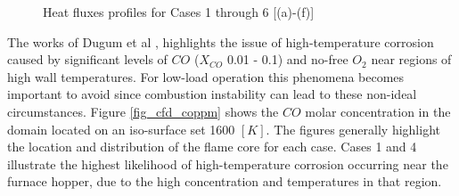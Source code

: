 \documentclass[review]{elsarticle}
\begin{document}
\begin{figure}[h!]
\hspace{5mm}
\caption{Heat fluxes profiles for Cases 1 through 6 [(a)-(f)]}
\label{fig_cfd_heat_flux}
\end{figure}

The works of Dugum et al \citep{Du2017}, highlights the issue of high-temperature corrosion caused by significant levels of $CO$ ($X_{CO}$ 0.01 - 0.1) and no-free $O_2$ near regions of high wall temperatures. For low-load operation this phenomena becomes important to avoid since combustion instability can lead to these non-ideal circumstances. Figure \ref{fig_cfd_coppm} shows the $CO$ molar concentration in the domain located on an iso-surface set 1600 $[K]$. The figures generally highlight the location and distribution of the flame core for each case. Cases 1 and 4 illustrate the highest likelihood of high-temperature corrosion occurring near the furnace hopper, due to the high concentration and temperatures in that region.
\end{document}
